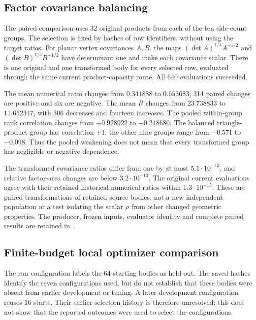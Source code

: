\subsection{Factor covariance balancing}\label{app:ds-balance}

The paired comparison uses 32 original products from each of the ten
side-count groups. The selection is fixed by hashes of row identifiers,
without using the target ratios. For planar vertex covariances $A,B$, the
maps $(\det A)^{1/4}A^{-1/2}$ and $(\det B)^{1/4}B^{-1/2}$ have determinant
one and make each covariance scalar. There is one original and one
transformed body for every selected row, evaluated through the same
current product-capacity route. All 640 evaluations succeeded.

The mean numerical ratio changes from $0.341888$ to $0.653683$; 314
paired changes are positive and six are negative. The mean $R$ changes
from $23.738833$ to $11.652347$, with 306 decreases and fourteen
increases. The pooled within-group rank correlation changes from
$-0.928922$ to $-0.248680$. The balanced triangle-product group has
correlation $+1$; the other nine groups range from $-0.571$ to $-0.098$.
Thus the pooled weakening does not mean that every transformed group has
negligible or negative dependence.

The transformed covariance ratios differ from one by at most
$5.1\cdot10^{-13}$, and relative factor-area changes are below
$3.2\cdot10^{-13}$. The original current evaluations agree with their
retained historical numerical ratios within $1.3\cdot10^{-15}$.
These are paired transformations of retained source bodies, not a new
independent population or a test isolating the scalar $\rho$ from other
changed geometric properties. The producer, frozen inputs, evaluator
identity and complete paired results are retained in
.

\subsection{Finite-budget local optimizer comparison}
\label{app:ds-local-optimization}

The run configuration labels the \(64\) starting bodies as held out.
The saved hashes identify the seven configurations used, but do not establish
that these bodies were absent from earlier development or tuning. A later
development configuration reuses \(16\) starts. Their earlier selection history
is therefore unresolved; this does not show that the reported outcomes were
used to select the configurations.

